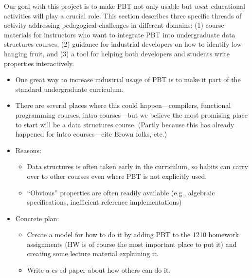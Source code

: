 
Our goal with this project is to make PBT not only usable but {\em
  used}; educational activities will play a crucial role.  This
section describes three specific threads of activity addressing pedagogical
challenges in different domains:
(1) course materials for instructors who want to integrate PBT into
undergraduate data structures courses,
%
(2) guidance for
industrial developers on how to identify low-hanging fruit, and
%
(3) a
tool for helping both developers and students write properties
interactively.



\begin{itemize}
\item One great way to increase industrial usage of PBT is to make it
part of the standard undergraduate curriculum.
\item There are several places where this could happen---compilers,
functional programming courses, intro courses---but we believe the
most promising place to start will be a data structures course.
(Partly because this has already happened for intro courses---cite
Brown folks, etc.)
\item Reasons:
  \begin{itemize}
  \item Data structures is often taken early in the curriculum, so
  habits can carry over to other courses even where PBT is not
  explicitly used.
  \item ``Obvious'' properties are often readily available (e.g.,
  algebraic specifications, inefficient reference implementations)
  \end{itemize}
\item Concrete plan:
\begin{itemize}
\item Create a model for how to do it by adding PBT to
the 1210 homework assignments (HW is of course the most important
place to put it) and creating some lecture material explaining it.
\item Write a cs-ed paper about how others can do it.
\end{itemize}
\end{itemize}

\ifdraft
{}
\fi

